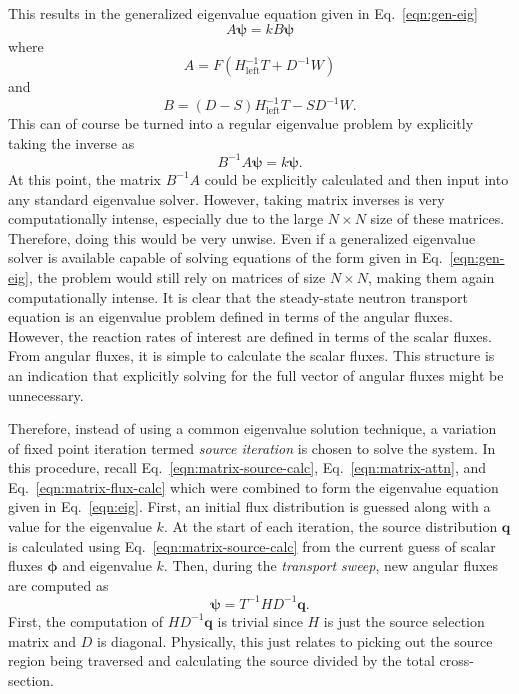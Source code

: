 This results in the generalized eigenvalue equation given in Eq.~\ref{eqn:gen-eig}
\begin{equation}
A \boldsymbol{\psi} = k B \boldsymbol{\psi}
\label{eqn:gen-eig}
\end{equation}
where
\begin{equation}
A = F \left(H_{\text{left}}^{-1} T + D^{-1} W \right)
\end{equation}
and
\begin{equation}
B = \left(D-S\right) H_{\text{left}}^{-1} T -  S D^{-1} W.
\end{equation}
This can of course be turned into a regular eigenvalue problem by explicitly taking the inverse as
\begin{equation}
B^{-1}A \boldsymbol{\psi} = k \boldsymbol{\psi}.
\label{eqn:eig}
\end{equation}
At this point, the matrix $B^{-1}A$ could be explicitly calculated and then input into any standard eigenvalue solver. However, taking matrix inverses is very computationally intense, especially due to the large $N \times N$ size of these matrices. Therefore, doing this would be very unwise. Even if a generalized eigenvalue solver is available capable of solving equations of the form given in Eq.~\ref{eqn:gen-eig}, the problem would still rely on matrices of size $N \times N$, making them again computationally intense. It is clear that the steady-state neutron transport equation is an eigenvalue problem defined in terms of the angular fluxes. However, the reaction rates of interest are defined in terms of the scalar fluxes. From angular fluxes, it is simple to calculate the scalar fluxes. This structure is an indication that explicitly solving for the full vector of angular fluxes might be unnecessary.

Therefore, instead of using a common eigenvalue solution technique, a variation of fixed point iteration termed \textit{source iteration} is chosen to solve the system. In this procedure, recall Eq.~\ref{eqn:matrix-source-calc}, Eq.~\ref{eqn:matrix-attn}, and Eq.~\ref{eqn:matrix-flux-calc} which were combined to form the eigenvalue equation given in Eq.~\ref{eqn:eig}. First, an initial flux distribution is guessed along with a value for the eigenvalue $k$. At the start of each iteration, the source distribution $\mathbf{q}$ is calculated using Eq.~\ref{eqn:matrix-source-calc} from the current guess of scalar fluxes $\boldsymbol{\phi}$ and eigenvalue $k$. Then, during the \textit{transport sweep}, new angular fluxes are computed as
\begin{equation}
\boldsymbol{\psi} = T^{-1} H D^{-1} \mathbf{q}.
\end{equation}
First, the computation of $HD^{-1}\mathbf{q}$ is trivial since $H$ is just the source selection matrix and $D$ is diagonal. Physically, this just relates to picking out the source region being traversed and calculating the source divided by the total cross-section.

